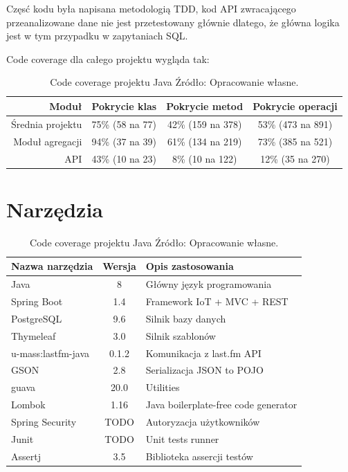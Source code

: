 \documentclass[brudnopis]{xmgr}
\begin{document}
Częsć kodu była napisana metodologią TDD,
kod API zwracającego przeanalizowane dane nie jest przetestowany głównie dlatego,
że główna logika jest w tym przypadku w zapytaniach SQL.

Code coverage dla całego projektu wygląda tak:
\begin{table}

	\begin{tabular}{|r|c|c|c|}
		\hline
		Moduł & Pokrycie klas & Pokrycie metod & Pokrycie operacji \\ \hline
		Średnia projektu & 75\% (58 na 77) & 42\% (159 na 378) & 53\% (473 na 891) \\  
		Moduł agregacji & 94\% (37 na 39) & 61\% (134 na 219) & 73\% (385 na 521) \\  
		API & 43\% (10 na 23) & 8\% (10 na 122) & 12\% (35 na 270) \\  \hline
	\end{tabular}

    \caption{
	Code coverage projektu Java
	\newline Źródło: Opracowanie własne.
	}
\label{Projekt --- Code coverage}
\end{table}

\section{Narzędzia}

\begin{table}
\begin{tabular}{|l|c|l|}
	\hline
	Nazwa narzędzia & Wersja & Opis zastosowania \\
	\hline
	Java & 8 & Główny język programowania \\
	\hline
	Spring Boot & 1.4 & Framework IoT + MVC + REST \\
	\hline
	PostgreSQL & 9.6 & Silnik bazy danych \\
	\hline
	Thymeleaf & 3.0 & Silnik szablonów \\
	\hline
	u-mass:lastfm-java & 0.1.2 & Komunikacja z last.fm API \\
	\hline
	GSON & 2.8 & Serializacja JSON to POJO \\
	\hline
	guava & 20.0 & Utilities \\
	\hline
	Lombok & 1.16 & Java boilerplate-free code generator \\
	\hline
	Spring Security & TODO & Autoryzacja użytkowników \\
	\hline
	Junit & TODO & Unit tests runner \\
	\hline
	Assertj & 3.5 & Biblioteka assercji testów \\
	\hline
\end{tabular}
    \caption{
	Code coverage projektu Java
	\newline Źródło: Opracowanie własne.
	}
	\label{Projekt - Code coverage}
\end{table}





\listoftables

\listoffigures

\oswiadczenie
\end{document}
